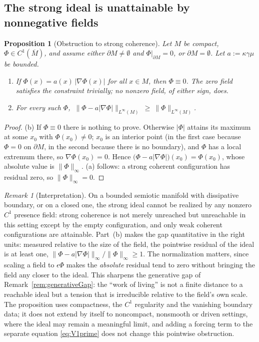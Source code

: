 \documentclass[11pt]{article}
\theoremstyle{plain}
\newtheorem{proposition}[theorem]{Proposition}
\theoremstyle{definition}
\theoremstyle{remark}
\newtheorem{remark}[theorem]{Remark}
\begin{document}
\subsection{The strong ideal is unattainable by nonnegative fields}\label{sec:strongObstruction}
\begin{proposition}[Obstruction to strong coherence]\label{prop:strongObstruction}
Let \(M\) be compact, \(\Phi\in C^1(\overline M)\), and assume either \(\partial M\ne\emptyset\) and \(\Phi|_{\partial M}=0\), or \(\partial M=\emptyset\). Let \(a:=\kappa\gamma\mu\) be bounded.
\begin{enumerate}[label=(\alph*),leftmargin=2em]
\item If \(\Phi(x)=a(x)\,|\nabla\Phi(x)|\) for all \(x\in M\), then \(\Phi\equiv 0\). The zero field satisfies the constraint trivially; no nonzero field, of either sign, does.
\item For every such \(\Phi\), \(\ \|\Phi-a|\nabla\Phi|\|_{L^\infty(M)}\ \ge\ \|\Phi\|_{L^\infty(M)}\).
\end{enumerate}
\end{proposition}
\begin{proof}
(b) If \(\Phi\equiv 0\) there is nothing to prove. Otherwise \(|\Phi|\) attains its maximum at some \(x_0\) with \(\Phi(x_0)\ne 0\); \(x_0\) is an interior point (in the first case because \(\Phi=0\) on \(\partial M\), in the second because there is no boundary), and \(\Phi\) has a local extremum there, so \(\nabla\Phi(x_0)=0\). Hence \(\big(\Phi-a|\nabla\Phi|\big)(x_0)=\Phi(x_0)\), whose absolute value is \(\|\Phi\|_\infty\). (a) follows: a strong coherent configuration has residual zero, so \(\|\Phi\|_\infty=0\).
\end{proof}
\begin{remark}[Interpretation]\label{rem:strongObstructionInterp}
On a bounded semiotic manifold with dissipative boundary, or on a closed one, the strong ideal cannot be realized by any nonzero \(C^1\) presence field: strong coherence is not merely unreached but unreachable in this setting except by the empty configuration, and only weak coherent configurations are attainable. Part~(b) makes the gap quantitative in the right units: measured relative to the size of the field, the pointwise residual of the ideal is at least one, \(\|\Phi-a|\nabla\Phi|\|_\infty/\|\Phi\|_\infty\ge 1\). The normalization matters, since scaling a field to \(\epsilon\Phi\) makes the \emph{absolute} residual tend to zero without bringing the field any closer to the ideal. This sharpens the generative gap of Remark~\ref{rem:generativeGap}: the ``work of living'' is not a finite distance to a reachable ideal but a tension that is irreducible relative to the field's own scale. The proposition uses compactness, the \(C^1\) regularity and the vanishing boundary data; it does not extend by itself to noncompact, nonsmooth or driven settings, where the ideal may remain a meaningful limit, and adding a forcing term to the separate equation \eqref{eq:V1prime} does not change this pointwise obstruction.
\end{remark}
\end{document}
